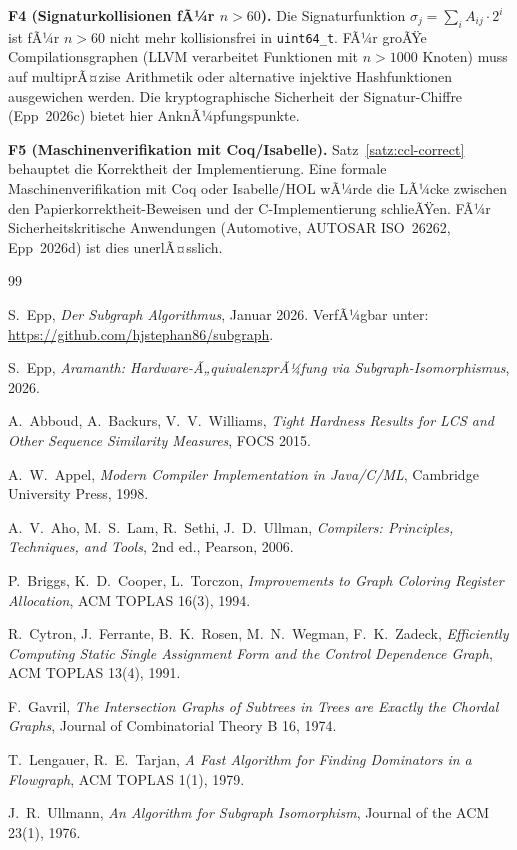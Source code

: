 ﻿\documentclass[a4paper,12pt]{article}
\theoremstyle{definition}
\begin{document}
\textbf{F4 (Signaturkollisionen fÃ¼r $n > 60$).}
Die Signaturfunktion $\sigma_j = \sum_i A_{ij} \cdot 2^i$ ist fÃ¼r
$n > 60$ nicht mehr kollisionsfrei in \texttt{uint64\_t}. FÃ¼r
groÃŸe Compilationsgraphen (LLVM verarbeitet Funktionen mit
$n > 1000$ Knoten) muss auf multiprÃ¤zise Arithmetik oder alternative
injektive Hashfunktionen ausgewichen werden. Die kryptographische
Sicherheit der Signatur-Chiffre (Epp~2026c) bietet hier
AnknÃ¼pfungspunkte.

\textbf{F5 (Maschinenverifikation mit Coq/Isabelle).}
Satz~\ref{satz:ccl-correct} behauptet die Korrektheit der
Implementierung. Eine formale Maschinenverifikation mit Coq oder
Isabelle/HOL wÃ¼rde die LÃ¼cke zwischen den Papierkorrektheit-Beweisen
und der C-Implementierung schlieÃŸen. FÃ¼r Sicherheitskritische
Anwendungen (Automotive, AUTOSAR ISO~26262, Epp~2026d) ist dies
unerlÃ¤sslich.


\begin{thebibliography}{99}

S.~Epp, \textit{Der Subgraph Algorithmus}, Januar 2026. VerfÃ¼gbar unter: \url{https://github.com/hjstephan86/subgraph}.

S.~Epp, \textit{Aramanth: Hardware-Ã„quivalenzprÃ¼fung via Subgraph-Isomorphismus}, 2026.

A.~Abboud, A.~Backurs, V.~V.~Williams, \textit{Tight Hardness Results for LCS and Other Sequence Similarity Measures}, FOCS 2015.

A.~W.~Appel, \textit{Modern Compiler Implementation in Java/C/ML}, Cambridge University Press, 1998.

A.~V.~Aho, M.~S.~Lam, R.~Sethi, J.~D.~Ullman, \textit{Compilers: Principles, Techniques, and Tools}, 2nd ed., Pearson, 2006.

P.~Briggs, K.~D.~Cooper, L.~Torczon, \textit{Improvements to Graph Coloring Register Allocation}, ACM TOPLAS 16(3), 1994.

R.~Cytron, J.~Ferrante, B.~K.~Rosen, M.~N.~Wegman, F.~K.~Zadeck, \textit{Efficiently Computing Static Single Assignment Form and the Control Dependence Graph}, ACM TOPLAS 13(4), 1991.

F.~Gavril, \textit{The Intersection Graphs of Subtrees in Trees are Exactly the Chordal Graphs}, Journal of Combinatorial Theory B 16, 1974.

T.~Lengauer, R.~E.~Tarjan, \textit{A Fast Algorithm for Finding Dominators in a Flowgraph}, ACM TOPLAS 1(1), 1979.

J.~R.~Ullmann, \textit{An Algorithm for Subgraph Isomorphism}, Journal of the ACM 23(1), 1976.

\end{thebibliography}
\end{document}
